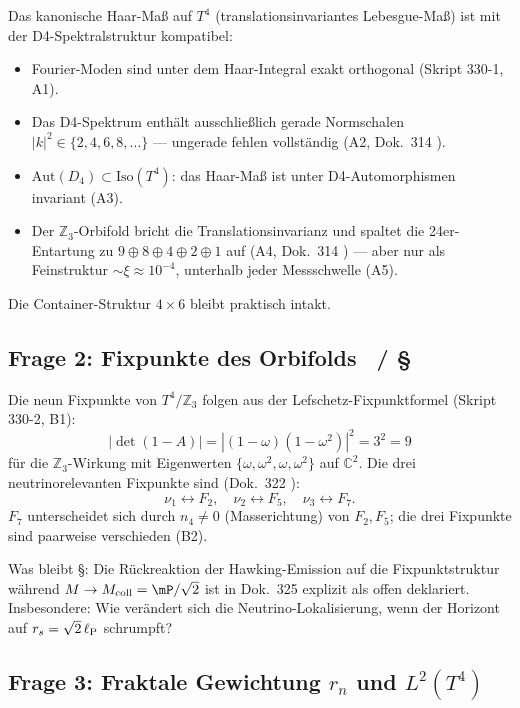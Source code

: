 Das kanonische Haar-Maß auf $T^4$ (translationsinvariantes
Lebesgue-Maß) ist mit der D4-Spektralstruktur kompatibel:
\begin{itemize}
  \item Fourier-Moden sind unter dem Haar-Integral exakt orthogonal
    (Skript 330-1, A1).
  \item Das D4-Spektrum enthält ausschließlich gerade Normschalen
    $|k|^2 \in \{2,4,6,8,\ldots\}$ — ungerade fehlen vollständig
    (A2, Dok.~314 \K).
  \item $\text{Aut}(D_4) \subset \text{Iso}(T^4)$:
    das Haar-Maß ist unter D4-Automorphismen invariant (A3).
  \item Der $\mathbb{Z}_3$-Orbifold bricht die Translationsinvarianz
    und spaltet die 24er-Entartung zu $9\oplus8\oplus4\oplus2\oplus1$
    auf (A4, Dok.~314 \K) — aber nur als Feinstruktur
    $\sim\xi \approx 10^{-4}$, unterhalb jeder Messschwelle (A5).
\end{itemize}
Die Container-Struktur $4\times6$ bleibt praktisch intakt. \B

\subsection{Frage 2: Fixpunkte des Orbifolds \K\ / \S}

Die neun Fixpunkte von $T^4/\mathbb{Z}_3$ folgen aus der
Lefschetz-Fixpunktformel (Skript 330-2, B1):
\[
  |\det(1-A)| = |(1-\omega)(1-\omega^2)|^2 = 3^2 = 9
\]
für die $\mathbb{Z}_3$-Wirkung mit Eigenwerten
$\{\omega,\omega^2,\omega,\omega^2\}$ auf $\mathbb{C}^2$.
Die drei neutrinorelevanten Fixpunkte sind (Dok.~322 \K):
\[
  \nu_1 \leftrightarrow F_2,\quad
  \nu_2 \leftrightarrow F_5,\quad
  \nu_3 \leftrightarrow F_7.
\]
$F_7$ unterscheidet sich durch $n_4 \neq 0$ (Masserichtung)
von $F_2,F_5$; die drei Fixpunkte sind paarweise verschieden (B2).

Was bleibt \S: Die Rückreaktion der Hawking-Emission auf die
Fixpunktstruktur während $M \to M_\mathrm{coll} = \mP/\sqrt{2}$
ist in Dok.~325 explizit als offen deklariert.
Insbesondere: Wie verändert sich die Neutrino-Lokalisierung,
wenn der Horizont auf $r_s = \sqrt{2}\,\ell_{\mathrm{P}}$ schrumpft?

\subsection{Frage 3: Fraktale Gewichtung $r_n$ und $L^2(T^4)$ \B}

